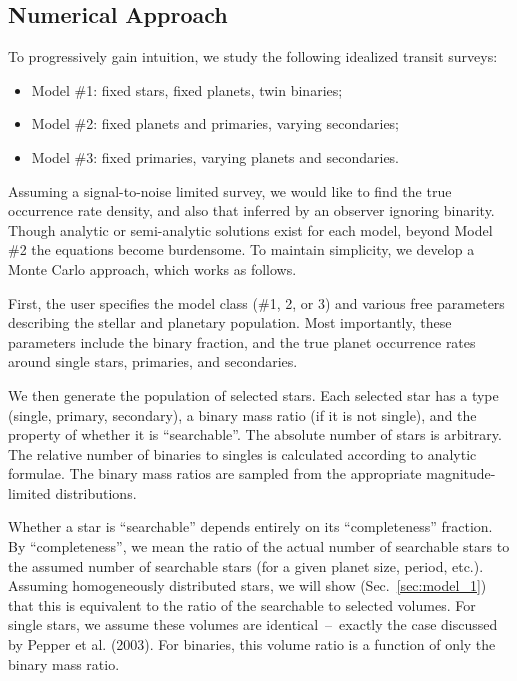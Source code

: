 \subsection{Numerical Approach}
\label{sec:numerical_methods}

To progressively gain intuition, we study the following idealized transit 
surveys:
\begin{itemize}
    \item Model \#1: fixed stars, fixed planets, twin binaries;
    \item Model \#2: fixed planets and primaries, varying secondaries;
    \item Model \#3: fixed primaries, varying planets and secondaries.
\end{itemize}

Assuming a signal-to-noise limited survey, we would like to find the true
occurrence rate density, and also that inferred by an observer ignoring 
binarity.
Though analytic or semi-analytic solutions exist for each model, beyond Model 
\#2 the equations become burdensome. To maintain simplicity, we develop a 
Monte Carlo approach, which works as follows.

First, the user specifies the model class (\#1, 2, or 3) and various free 
parameters describing the stellar and planetary population.
Most importantly, these parameters include the binary fraction, and the true 
planet occurrence rates around single stars, primaries, and secondaries.
                                                               
We then generate the population of selected stars.
Each selected star has a type (single, primary, secondary), 
a binary mass ratio (if it is not single), and the property of whether it 
is ``searchable''.               
The absolute number of stars is arbitrary.
The relative number of binaries to singles is calculated according to analytic
formulae. The binary mass ratios are sampled from the
appropriate magnitude-limited distributions.

Whether a star is ``searchable'' depends entirely on its ``completeness''
fraction. By ``completeness'', we mean the ratio of the actual number of 
searchable stars to the assumed number of searchable stars (for a given planet 
size, period, etc.).
Assuming homogeneously distributed stars, we will show 
(Sec.~\ref{sec:model_1}) that this is equivalent to the
ratio of the searchable to selected volumes.
For single stars, we assume these volumes are identical~--~exactly the case 
discussed by Pepper et al. (2003).
For binaries, this volume ratio is a function of only the binary mass ratio.

